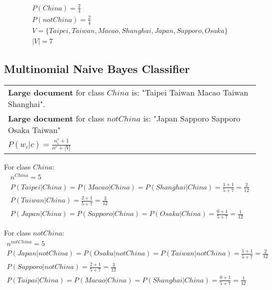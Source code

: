 \documentclass{article}
\begin{document}
\begin{align}
P(China) = \frac{2}{4} \\
P(notChina) = \frac{2}{4} \\
V = \lbrace Taipei, Taiwan, Macao, Shanghai, Japan, Sapporo, Osaka \rbrace \\
|V| = 7
\end{align}

\subsection{Multinomial Naive Bayes Classifier}

\begin{tabular}{l}
\textbf{Large document} for class $China$ is: "Taipei Taiwan Macao Taiwan Shanghai". \\
\textbf{Large document} for class $notChina$ is: "Japan Sapporo Sapporo Osaka Taiwan" \\
$P(w_i|c) = \frac{n_i^c + 1}{n^c + |V|}$
\end{tabular}

\hspace{2pt}

For class $China$:
\begin{align}
n^{China} = 5 \\
P(Taipei|China) = P(Macao|China) = P(Shanghai|China) = \frac{1 + 1}{5 + 7} = \frac{2}{12} \\
P(Taiwan|China) = \frac{2 + 1}{5 + 7} = \frac{3}{12} \\
P(Japan|China) = P(Sapporo|China) = P(Osaka|China) = \frac{0 + 1}{5 + 7} = \frac{1}{12}
\end{align}

For class $notChina$:
\begin{align}
n^{notChina} = 5 \\
P(Japan|notChina) = P(Osaka|notChina) = P(Taiwan|notChina) = \frac{1 + 1}{5 + 7} = \frac{2}{12} \\
P(Sapporo|notChina) = \frac{2 + 1}{5 + 7} = \frac{3}{12} \\
P(Taipai|China) = P(Macao|China) = P(Shanghai|China) = \frac{0 + 1}{5 + 7} = \frac{1}{12} \\
\end{align}
\end{document}
